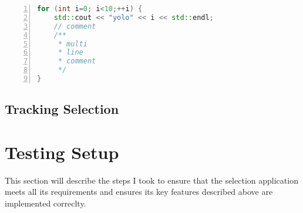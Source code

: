 \begin{lstlisting}[language=C++,numberstyle=\zebra{black!5}{white}{},numbers=left,xleftmargin=2em]
for (int i=0; i<10;++i) {
	std::cout << "yolo" << i << std::endl;
	// comment
	/**
	 * multi
	 * line
	 * comment
	 */
}
\end{lstlisting}

\subsection{Tracking Selection}
\label{sec:tracking_selection}

\section{Testing Setup}
\label{sec:testing_setup}
This section will describe the steps I took to ensure that the selection application meets all its requirements and ensures its key features described above are implemented correclty.
